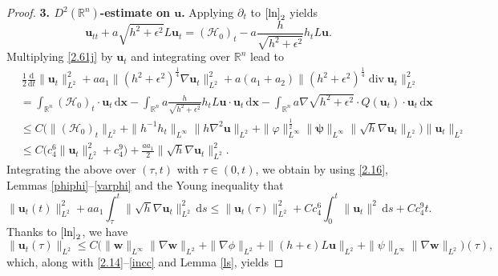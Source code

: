 \documentclass[11pt,reqno]{amsart}
\DeclareMathOperator{\diver}{\mathrm{div}}
\numberwithin{rk}{section}
\numberwithin{prop}{section}
\numberwithin{mydef}{section}
\numberwithin{lem}{section}
\numberwithin{equation}{section}
\numberwithin{thm}{section}
\begin{document}
\begin{proof}
\smallskip
\textbf{3. $D^2(\mathbb{R}^n)$-estimate on $\boldsymbol{u}$.} Applying $\partial_t$ to $\eqref{ln}_2$ yields
\begin{equation}\label{2.61j}
\boldsymbol{u}_{tt}+a\sqrt{h^2+\epsilon^2}L\boldsymbol{u}_t= (\mathcal{H}_0)_t-a\frac{h}{\sqrt{h^2+\epsilon^2}} h_tL\boldsymbol{u}.
\end{equation}
Multiplying \eqref{2.61j} by $\boldsymbol{u}_t$ and integrating over $\mathbb{R}^n$  lead to 
\begin{equation*} 
\begin{aligned}
&\,\frac{1}{2}\frac{\mathrm{d}}{\mathrm{d}t}\|\boldsymbol{u}_{t}\|^2_{L^2}+aa_1\|(h^2+\epsilon^2)^{\frac{1}{4}}\nabla \boldsymbol{u}_t\|_{L^2}^2+a(a_1+a_2)\|(h^2+\epsilon^2)^{\frac{1}{4}}\diver \boldsymbol{u}_t\|_{L^2}^2\\
&=\int_{\mathbb{R}^n} (\mathcal{H}_0)_t\cdot \boldsymbol{u}_t\,\mathrm{d}\boldsymbol{x}-\int_{\mathbb{R}^n} a\frac{h}{\sqrt{h^2+\epsilon^2}} h_tL\boldsymbol{u}\cdot \boldsymbol{u}_t\,\mathrm{d}\boldsymbol{x}-\int_{\mathbb{R}^n} a\nabla\sqrt{h^2+\epsilon^2}\cdot Q(\boldsymbol{u}_t)\cdot \boldsymbol{u}_t\,\mathrm{d}\boldsymbol{x}\\
&\leq C\big(\|(\mathcal{H}_0)_t\|_{L^2}+\|h^{-1}h_t\|_{L^\infty}\|h\nabla^2\boldsymbol{u}\|_{L^2}+\|\varphi\|^{\frac{1}{2}}_{L^\infty}\|\boldsymbol{\psi}\|_{L^\infty}\|\sqrt{h}\nabla \boldsymbol{u}_t\|_{L^2}\big)\|\boldsymbol{u}_t\|_{L^2}\\
&\leq C\big(c^6_4\|\boldsymbol{u}_{t}\|^2_{L^2}+c^9_4\big)+\frac{aa_1}{2}\|\sqrt{h}\nabla \boldsymbol{u}_t\|_{L^2}^2.
\end{aligned}
\end{equation*}
Integrating the above over $(\tau,t)$ with $\tau\in(0,t)$,  we obtain by using \eqref{2.16}, Lemmas \ref{phiphi}--\ref{varphi}  and the Young inequality that
\begin{equation}\label{2.61n}
\|\boldsymbol{u}_t(t)\|^2_{L^2}+aa_1\int^t_\tau\|\sqrt{h}\nabla \boldsymbol{u}_t\|^2_{L^2}\,\mathrm{d}s\leq  \|\boldsymbol{u}_t(\tau)\|^2_{L^2}+Cc_4^{6}\int^t_0\|\boldsymbol{u}_t\|^2\,\mathrm{d}s+Cc_4^9t.
\end{equation}
Thanks to $\eqref{ln}_2$, we have
\begin{equation*} 
\|\boldsymbol{u}_t(\tau)\|_{L^2}\leq  C\big(\|\boldsymbol{w}\|_{L^\infty}\|\nabla \boldsymbol{w}\|_{L^2}+\|\nabla\phi\|_{L^2}+\|(h+\epsilon)L\boldsymbol{u}\|_{L^2}+\|\psi\|_{L^\infty}\|\nabla \boldsymbol{w}\|_{L^2}\big)(\tau),
\end{equation*}
which, along with \eqref{2.14}--\eqref{incc} and Lemma \ref{ls}, yields 

\end{proof}
\end{document}
